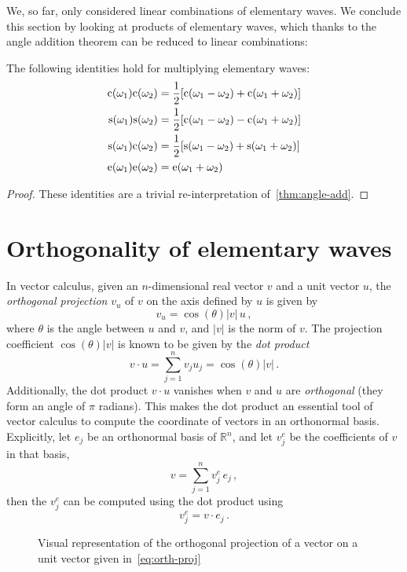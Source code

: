 We, so far, only considered linear combinations of elementary waves. We conclude this section by looking at products of elementary waves, which thanks to the angle addition theorem can be reduced to linear combinations:
\begin{proposition}
  The following identities hold for multiplying elementary waves:
  \begin{align}
    \mathrm{c}(\omega_1)\mathrm{c}(\omega_2)&=\frac{1}{2}[\mathrm{c}(\omega_1-\omega_2)+\mathrm{c}(\omega_1+\omega_2)]\label{eq:cprod}\\
    \mathrm{s}(\omega_1)\mathrm{s}(\omega_2)&=\frac{1}{2}[\mathrm{c}(\omega_1-\omega_2)-\mathrm{c}(\omega_1+\omega_2)]\label{eq:sprod}\\
    \mathrm{s}(\omega_1)\mathrm{c}(\omega_2)&=\frac{1}{2}[\mathrm{s}(\omega_1-\omega_2)+\mathrm{s}(\omega_1+\omega_2)]\label{eq:scprod}\\
    \mathrm{e}(\omega_1)\mathrm{e}(\omega_2)&=\mathrm{e}(\omega_1+\omega_2)\label{eq:eprod}
  \end{align}
\end{proposition}
\begin{proof}
  These identities are a trivial re-interpretation of~\cref{thm:angle-add}.
\end{proof}
\section{Orthogonality of elementary waves}
In vector calculus, given an $n$-dimensional real vector $v$ and a unit vector $u$, the \emph{orthogonal projection} $v_u$ of $v$ on the axis defined by $u$ is given by
\begin{equation}
  \label{eq:orth-proj}
  v_u=\cos(\theta)|v|\,u\,,
\end{equation}
where $\theta$ is the angle between $u$ and $v$, and $|v|$ is the norm of $v$. The projection coefficient $\cos(\theta)|v|$ is known to be
given by the \emph{dot product}
\begin{equation}
  v\cdot u=\sum_{j=1}^n v_j u_j=\cos(\theta)|v|\,.\label{eq:vec-dot}
\end{equation}
Additionally, the dot product $v\cdot u$ vanishes when $v$ and $u$ are \emph{orthogonal} (\ie they form an angle of $\pi$ radians). This makes the dot product an essential tool of vector calculus to compute the coordinate of vectors in an orthonormal basis. Explicitly, let $e_j$ be an orthonormal basis of $\mathbb{R}^n$, and let $v^{e}_j$ be the coefficients of $v$ in that basis, \ie
\begin{equation}
  v=\sum_{j=1}^{n}v^{e}_j\,e_j\,,
\end{equation}
then the $v^{e}_j$ can be computed using the dot product using
\begin{equation}
  v^{e}_j=v\cdot e_j\,.\label{eq:basis-proj}
\end{equation}
\begin{figure}
  \caption{Visual representation of the orthogonal projection of a vector on a unit vector given in~\cref{eq:orth-proj}}
  \label{fig:orth-proj}
\end{figure}

